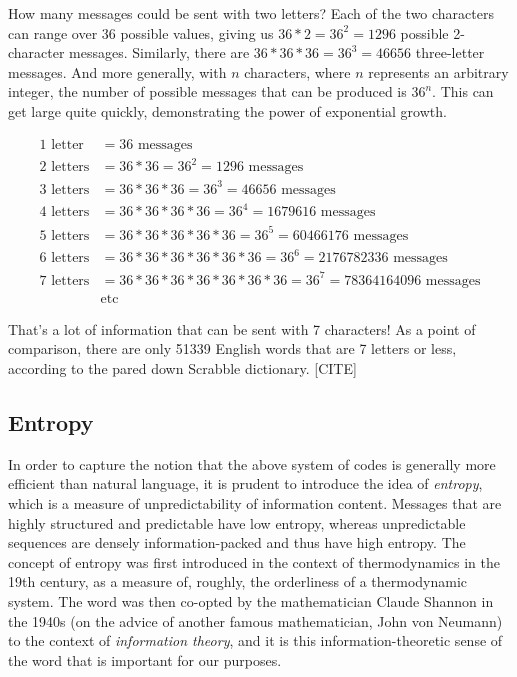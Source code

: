 \documentclass[UTF8]{book}
\begin{document}
\begin{CJK}{UTF8}{gbsn}
How many messages could be sent with two letters? Each of the two characters can range over 36 possible values, giving us $36*2=36^{2}=1296$ possible 2-character messages. Similarly, there are $36*36*36=36^{3}=46656$ three-letter messages. And more generally, with $n$ characters, where $n$ represents an arbitrary integer, the number of possible messages that can be produced is $36^{n}$. This can get large quite quickly, demonstrating the power of exponential growth.

\begin{align*}
1 \text{ letter} &= 36 \text{ messages} \\
2 \text{ letters} &= 36*36 = 36^{2} = 1296 \text{ messages} \\
3 \text{ letters} &= 36*36*36 = 36^{3} = 46656 \text{ messages} \\
4 \text{ letters} &= 36*36*36*36 = 36^{4} = 1679616 \text{ messages} \\
5 \text{ letters} &= 36*36*36*36*36 = 36^{5} = 60466176 \text{ messages} \\
6 \text{ letters} &= 36*36*36*36*36*36 = 36^{6} = 2176782336 \text{ messages} \\
7 \text{ letters} &= 36*36*36*36*36*36*36 = 36^{7} = 78364164096 \text{ messages} \\
&\text{etc}
\end{align*}

That's a lot of information that can be sent with 7 characters! As a point of comparison, there are only 51339 English words that are 7 letters or less, according to the pared down Scrabble dictionary. [CITE]

\subsection*{Entropy}

In order to capture the notion that the above system of codes is generally more efficient than natural language, it is prudent to introduce the idea of \emph{entropy}, which is a measure of unpredictability of information content. Messages that are highly structured and predictable have low entropy, whereas unpredictable sequences are densely information-packed and thus have high entropy. The concept of entropy was first introduced in the context of thermodynamics in the 19th century, as a measure of, roughly, the orderliness of a thermodynamic system. The word was then co-opted by the mathematician Claude Shannon in the 1940s (on the advice of another famous mathematician, John von Neumann) to the context of \emph{information theory}, and it is this information-theoretic sense of the word that is important for our purposes.


\end{CJK}
\end{document}
